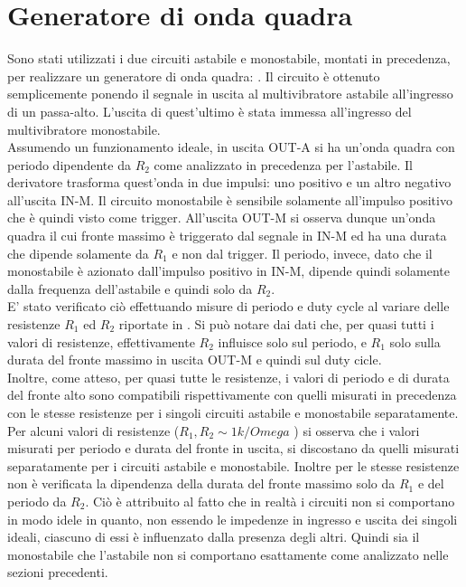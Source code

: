 \section{Generatore di onda quadra}
Sono stati utilizzati i due circuiti astabile e monostabile, montati in precedenza, per realizzare un generatore di onda quadra: . Il circuito è ottenuto semplicemente ponendo il segnale in uscita al multivibratore astabile all'ingresso di un passa-alto. L'uscita di quest'ultimo è stata immessa all'ingresso del multivibratore monostabile. \\
Assumendo un funzionamento ideale, in uscita OUT-A si ha un'onda quadra con periodo dipendente da $R_{2}$ come analizzato in precedenza per l'astabile. Il derivatore trasforma quest'onda in due impulsi: uno positivo e un altro negativo all'uscita IN-M. Il circuito monostabile è sensibile solamente all'impulso positivo che è quindi visto come trigger.
 All'uscita OUT-M si osserva dunque un'onda quadra il cui fronte massimo è triggerato dal segnale in IN-M ed ha una durata che dipende solamente da $R_{1}$ e non dal trigger. Il periodo, invece, dato che il monostabile è azionato dall'impulso positivo in IN-M, dipende quindi solamente dalla frequenza dell'astabile e quindi solo da $R_{2}$.\\
 E' stato verificato ciò effettuando misure di periodo e duty cycle al variare delle resistenze $R_{1}$ ed $R_{2}$ riportate in . Si può notare dai dati che, per quasi tutti i valori di resistenze, effettivamente $R_{2}$ influisce solo sul periodo, e $R_{1}$ solo sulla durata del fronte massimo in uscita OUT-M e quindi sul duty cicle. \\
 Inoltre, come atteso, per quasi tutte le resistenze, i valori di periodo e di durata del fronte alto sono compatibili rispettivamente con quelli misurati in precedenza con le stesse resistenze per i singoli circuiti astabile e monostabile separatamente.\\
 Per alcuni valori di resistenze ($R_{1},R_{2}\sim 1 k/Omega$ ) si osserva che i valori misurati per periodo e durata del fronte in uscita, si discostano da quelli misurati separatamente per i circuiti astabile e monostabile. Inoltre per le stesse resistenze non è verificata la dipendenza della durata del fronte massimo solo da $R_1 $ e del periodo da $R_2$. Ciò è attribuito al fatto che in realtà i circuiti non si comportano in modo idele in quanto, non essendo le impedenze in ingresso e uscita dei singoli ideali,  ciascuno di essi è influenzato dalla presenza degli altri. Quindi sia il monostabile che l'astabile non si comportano esattamente come analizzato nelle sezioni precedenti.\\
